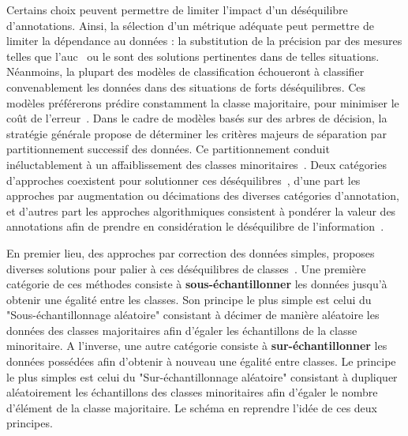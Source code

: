 Certains choix peuvent permettre de limiter l'impact d'un déséquilibre d'annotations. Ainsi, la sélection d'un métrique adéquate peut permettre de limiter la dépendance au données : la substitution de la précision par des mesures telles que l'\gls{auc}~\cite{Celebi2007} ou le \fscore sont des solutions pertinentes dans de telles situations. Néanmoins, la plupart des modèles de classification échoueront à classifier convenablement les données dans des situations de forts déséquilibres. Ces modèles préférerons prédire constamment la classe majoritaire, pour minimiser le coût de l'erreur~\cite{Huang2013}. Dans le cadre de modèles basés sur des arbres de décision, la stratégie générale propose de déterminer les critères majeurs de séparation par partitionnement successif des données. Ce partitionnement conduit inéluctablement à un affaiblissement des classes minoritaires~\cite{He2009}. Deux catégories d'approches coexistent pour solutionner ces déséquilibres~\cite{Huang2013}, d'une part les approches par augmentation ou décimations des diverses catégories d'annotation, et d'autres part les approches algorithmiques consistent à pondérer la valeur des annotations afin de prendre en considération le déséquilibre de l'information~\cite{Ting2002,He2009,Thai2010}.\par

En premier lieu, des approches par correction des données simples, proposes diverses solutions pour palier à ces déséquilibres de classes~\cite{Prati2009, He2009}. Une première catégorie de ces méthodes consiste à \textbf{sous-échantillonner} les données jusqu'à obtenir une égalité entre les classes. Son principe le plus simple est celui du "Sous-échantillonnage aléatoire" consistant à décimer de manière aléatoire les données des classes majoritaires afin d'égaler les échantillons de la classe minoritaire. A l'inverse, une autre catégorie consiste à \textbf{sur-échantillonner} les données possédées afin d'obtenir à nouveau une égalité entre classes. Le principe le plus simples est celui du "Sur-échantillonnage aléatoire" consistant à dupliquer aléatoirement les échantillons des classes minoritaires afin d'égaler le nombre d'élément de la classe majoritaire. Le schéma en  reprendre l'idée de ces deux principes.\par


